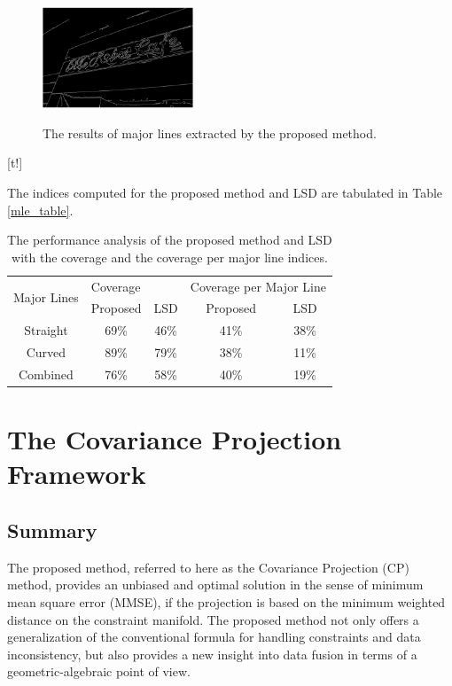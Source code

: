 \documentclass{ieeeaccess}
\begin{document}

\begin{figure}[t!]
\centering
\includegraphics[width=0.4\textwidth]{mle_result_a.png}
\label{mle_result_a}
\caption{The results of major lines extracted by the proposed
method.}
\end{figure}[t!]

The indices computed for
the proposed method and LSD are tabulated in Table \ref{mle_table}. 

\begin{table}
\caption{The performance analysis of the proposed method and LSD with
the coverage and the coverage per major line indices.}

\label{mle_table}
\setlength{\tabcolsep}{3pt}
\centering
\begin{tabular}{|c|c|c|c|c|}
\hline
\multirow{2}{*}{Major Lines} & \multicolumn{2}{l|}{Coverage} & \multicolumn{2}{l|}{Coverage per Major Line} \\ \cline{2-5} 
                             & Proposed         & LSD        & Proposed                & LSD                \\ \hline
Straight                     &   69\%               &     46\%       &          41\%               &                   38\% \\ \hline
Curved                      &     89\%         &     79\%     &         38\%            &           11\% \\ \hline
Combined                      &    76\%       &     58\%     &      40\%             &               19\% \\ \hline
\end{tabular}
\label{tab1}
\end{table}

\section{The Covariance Projection Framework}
\subsection{Summary}
The proposed method, referred to here as the Covariance Projection (CP) method, provides an
unbiased and optimal solution in the sense of minimum mean square error (MMSE), if the projection
is based on the minimum weighted distance on the constraint manifold. The proposed method
not only offers a generalization of the conventional formula for handling constraints and data
inconsistency, but also provides a new insight into data fusion in terms of a geometric-algebraic
point of view.
\end{document}

